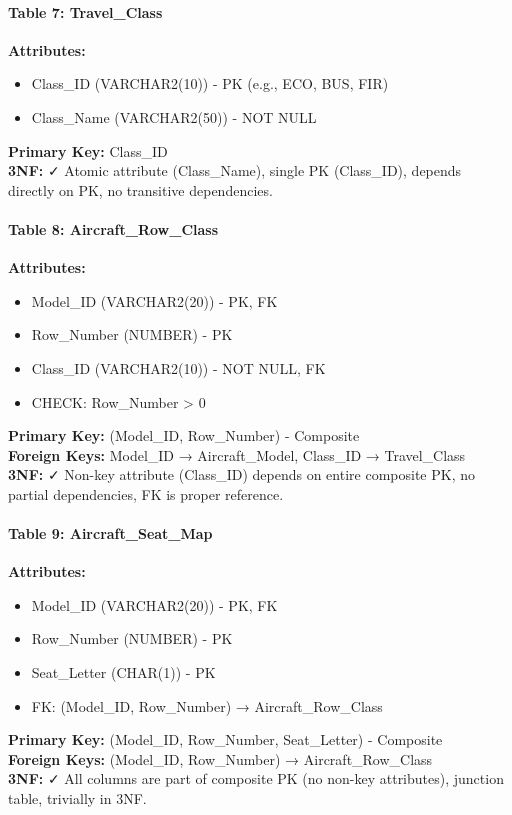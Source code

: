 \documentclass[12pt,a4paper,openany]{report}
\begin{document}
\paragraph{Table 7: Travel\_Class}
\textbf{Attributes:} 
\begin{itemize}
    \item Class\_ID (VARCHAR2(10)) - PK (e.g., ECO, BUS, FIR)
    \item Class\_Name (VARCHAR2(50)) - NOT NULL
\end{itemize}
\textbf{Primary Key:} Class\_ID\\
\textbf{3NF:} ✓ Atomic attribute (Class\_Name), single PK (Class\_ID), depends directly on PK, no transitive dependencies.

\paragraph{Table 8: Aircraft\_Row\_Class}
\textbf{Attributes:} 
\begin{itemize}
    \item Model\_ID (VARCHAR2(20)) - PK, FK
    \item Row\_Number (NUMBER) - PK
    \item Class\_ID (VARCHAR2(10)) - NOT NULL, FK
    \item CHECK: Row\_Number > 0
\end{itemize}
\textbf{Primary Key:} (Model\_ID, Row\_Number) - Composite\\
\textbf{Foreign Keys:} Model\_ID → Aircraft\_Model, Class\_ID → Travel\_Class\\
\textbf{3NF:} ✓ Non-key attribute (Class\_ID) depends on entire composite PK, no partial dependencies, FK is proper reference.

\paragraph{Table 9: Aircraft\_Seat\_Map}
\textbf{Attributes:} 
\begin{itemize}
    \item Model\_ID (VARCHAR2(20)) - PK, FK
    \item Row\_Number (NUMBER) - PK
    \item Seat\_Letter (CHAR(1)) - PK
    \item FK: (Model\_ID, Row\_Number) → Aircraft\_Row\_Class
\end{itemize}
\textbf{Primary Key:} (Model\_ID, Row\_Number, Seat\_Letter) - Composite\\
\textbf{Foreign Keys:} (Model\_ID, Row\_Number) → Aircraft\_Row\_Class\\
\textbf{3NF:} ✓ All columns are part of composite PK (no non-key attributes), junction table, trivially in 3NF.
\end{document}
